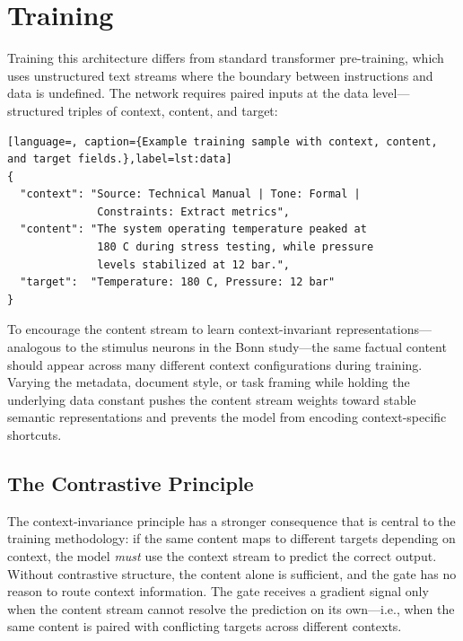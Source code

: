 \documentclass[11pt,a4paper]{article}
\theoremstyle{definition}
\begin{document}
\section{Training}\label{sec:training}

Training this architecture differs from standard transformer pre-training, which uses unstructured text streams where the boundary between instructions and data is undefined. The network requires paired inputs at the data level---structured triples of context, content, and target:

\begin{lstlisting}[language=, caption={Example training sample with context, content, and target fields.},label=lst:data]
{
  "context": "Source: Technical Manual | Tone: Formal |
              Constraints: Extract metrics",
  "content": "The system operating temperature peaked at
              180 C during stress testing, while pressure
              levels stabilized at 12 bar.",
  "target":  "Temperature: 180 C, Pressure: 12 bar"
}
\end{lstlisting}

To encourage the content stream to learn context-invariant representations---analogous to the stimulus neurons in the Bonn study---the same factual content should appear across many different context configurations during training. Varying the metadata, document style, or task framing while holding the underlying data constant pushes the content stream weights toward stable semantic representations and prevents the model from encoding context-specific shortcuts.

\subsection{The Contrastive Principle}\label{sec:contrastive}

The context-invariance principle has a stronger consequence that is central to the training methodology: if the same content maps to different targets depending on context, the model \emph{must} use the context stream to predict the correct output. Without contrastive structure, the content alone is sufficient, and the gate has no reason to route context information. The gate receives a gradient signal only when the content stream cannot resolve the prediction on its own---i.e., when the same content is paired with conflicting targets across different contexts.
\end{document}
